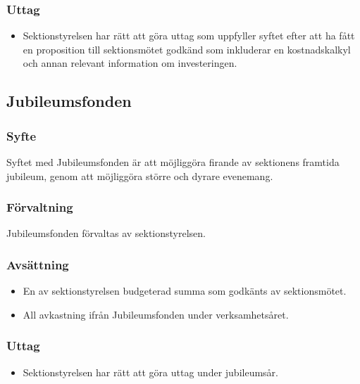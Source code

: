 \documentclass[a4paper]{dtek}
\begin{document}
\subsubsection{Uttag}
\begin{itemize}
  \item Sektionstyrelsen har rätt att göra uttag som uppfyller syftet efter att ha fått en proposition till sektionsmötet godkänd som inkluderar en kostnadskalkyl och annan relevant information om investeringen.
\end{itemize}
\subsection{Jubileumsfonden}
\subsubsection{Syfte}
\label{sec:jubileumfond_syfte}
Syftet med Jubileumsfonden är att möjliggöra firande av sektionens framtida jubileum, genom att möjliggöra större och dyrare evenemang.
\subsubsection{Förvaltning}
Jubileumsfonden förvaltas av sektionstyrelsen.
\subsubsection{Avsättning}
\begin{itemize}
  \item En av sektionstyrelsen budgeterad summa som godkänts av sektionsmötet.
  \item All avkastning ifrån Jubileumsfonden under verksamhetsåret.
\end{itemize}
\subsubsection{Uttag}
\begin{itemize}
  \item Sektionstyrelsen har rätt att göra uttag under jubileumsår.
\end{itemize}
\end{document}

